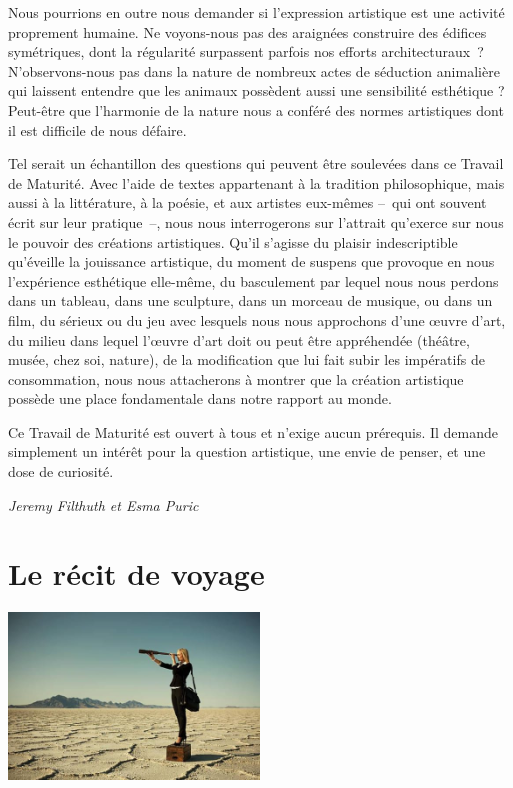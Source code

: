 \documentclass[
  10pt,
  french,
  a5paper,
  openany]{book}
\newenvironment{signature}{\begin{flushright}}{\end{flushright}}
\begin{document}
Nous pourrions en outre nous demander si l'expression artistique est une activité proprement humaine. Ne voyons-nous pas des araignées construire des édifices symétriques, dont la régularité surpassent parfois nos efforts architecturaux~? N'observons-nous pas dans la nature de nombreux actes de séduction animalière qui laissent entendre que les animaux possèdent aussi une sensibilité esthétique ? Peut-être que l'harmonie de la nature nous a conféré des normes artistiques dont il est difficile de nous défaire.

Tel serait un échantillon des questions qui peuvent être soulevées dans ce Travail de Maturité. Avec l'aide de textes appartenant à la tradition philosophique, mais aussi à la littérature, à la poésie, et aux artistes eux-mêmes --~qui ont souvent écrit sur leur pratique~--, nous nous interrogerons sur l'attrait qu'exerce sur nous le pouvoir des créations artistiques. Qu'il s'agisse du plaisir indescriptible qu'éveille la jouissance artistique, du moment de suspens que provoque en nous l'expérience esthétique elle-même, du basculement par lequel nous nous perdons dans un tableau, dans une sculpture, dans un morceau de musique, ou dans un film, du sérieux ou du jeu avec lesquels nous nous approchons d'une œuvre d'art, du milieu dans lequel l'œuvre d'art doit ou peut être appréhendée (théâtre, musée, chez soi, nature), de la modification que lui fait subir les impératifs de consommation, nous nous attacherons à montrer que la création artistique possède une place fondamentale dans notre rapport au monde.

Ce Travail de Maturité est ouvert à tous et n'exige aucun prérequis. Il demande simplement un intérêt pour la question artistique, une envie de penser, et une dose de curiosité.

\begin{signature}
\emph{Jeremy Filthuth et Esma Puric}

\end{signature}

\hypertarget{le-ruxe9cit-de-voyage}{%
\chapter{Le récit de voyage}\label{le-ruxe9cit-de-voyage}}

\begin{center}
\includegraphics[width=\textwidth,height=12em]{images/le-recit-de-voyage.jpg}

\end{center}
\end{document}
